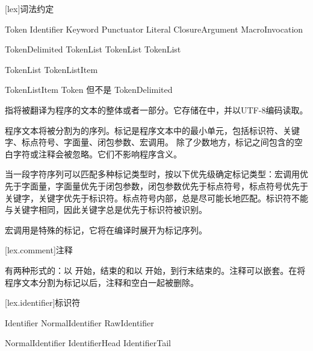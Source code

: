 
[lex]{词法约定}

\begin{bnf}{Token}
    Identifier \br
    Keyword \br
    Punctuator \br
    Literal \br
    ClosureArgument \br
    MacroInvocation
\end{bnf}

\begin{bnf}{TokenDelimited}
    \terminal{(} TokenList\bnfq \terminal{)} \br
    \terminal{[} TokenList\bnfq \terminal{]} \br
    \terminal{\{} TokenList\bnfq \terminal{\}}
\end{bnf}

\begin{bnf}{TokenList}
    TokenListItem\bnfp
\end{bnf}

\begin{bnf}{TokenListItem}
    Token \textnormal{但不是} \terminal{( ) [ ] \{ \}} \br
    TokenDelimited
\end{bnf}

\pnum
{}指将被翻译为\X{}程序的文本的整体或者一部分。它存储在中，并以UTF-8编码读取。

\pnum
程序文本将被分割为的序列。标记是程序文本中的最小单元，包括标识符、关键字、标点符号、字面量、闭包参数、宏调用。
除了少数地方，标记之间包含的空白字符或注释会被忽略。它们不影响程序含义。

\pnum
当一段字符序列可以匹配多种标记类型时，按以下优先级确定标记类型：宏调用优先于字面量，字面量优先于闭包参数，闭包参数优先于标点符号，标点符号优先于关键字，关键字优先于标识符。标点符号内部，总是尽可能长地匹配。标识符不能与关键字相同，因此关键字总是优先于标识符被识别。

\pnum
宏调用是特殊的标记，它将在编译时展开为标记序列。

[lex.comment]{注释}

\pnum
有两种形式的：以\tcode{/*} 开始，\tcode{*/}结束的和以\tcode{//} 开始，到行末结束的。注释可以嵌套。在将程序文本分割为标记以后，注释和空白一起被删除。

[lex.identifier]{标识符}

\begin{bnf}{Identifier}
    NormalIdentifier \br
    RawIdentifier
\end{bnf}

\begin{bnf}{NormalIdentifier}
    IdentifierHead IdentifierTail\bnfs
\end{bnf}

